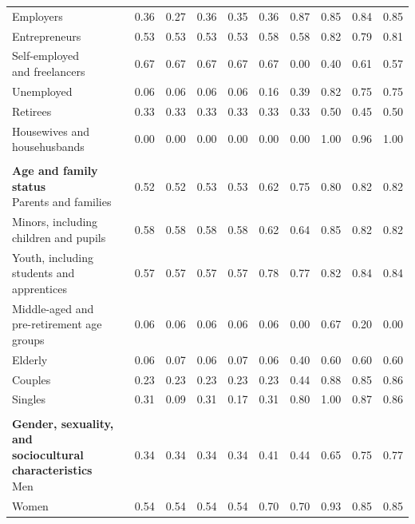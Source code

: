 \begin{table}[htb]
\begin{threeparttable}
\begin{tabular}{l c c c c c c c c c}
Employers & 0.36 & 0.27 & 0.36 & 0.35 & 0.36 & 0.87 & 0.85 & 0.84 & 0.85 \\
Entrepreneurs & 0.53 & 0.53 & 0.53 & 0.53 & 0.58 & 0.58 & 0.82 & 0.79 & 0.81 \\
\shortstack[l]{Self-employed\\[-3pt]and freelancers} & 0.67 & 0.67 & 0.67 & 0.67 & 0.67 & 0.00 & 0.40 & 0.61 & 0.57 \\
Unemployed & 0.06 & 0.06 & 0.06 & 0.06 & 0.16 & 0.39 & 0.82 & 0.75 & 0.75 \\
Retirees & 0.33 & 0.33 & 0.33 & 0.33 & 0.33 & 0.33 & 0.50 & 0.45 & 0.50 \\
\shortstack[l]{Housewives and\\[-3pt]househusbands} & 0.00 & 0.00 & 0.00 & 0.00 & 0.00 & 0.00 & 1.00 & 0.96 & 1.00 \\
\rule{0pt}{5pt} &  &  &  &  &  &  &  &  &  \\
\shortstack[l]{\textbf{Age and family status}\\[3pt]Parents and families} & 0.52 & 0.52 & 0.53 & 0.53 & 0.62 & 0.75 & 0.80 & 0.82 & 0.82 \\
\shortstack[l]{Minors, including\\[-3pt]children and pupils} & 0.58 & 0.58 & 0.58 & 0.58 & 0.62 & 0.64 & 0.85 & 0.82 & 0.82 \\
\shortstack[l]{Youth, including\\[-3pt]students and apprentices} & 0.57 & 0.57 & 0.57 & 0.57 & 0.78 & 0.77 & 0.82 & 0.84 & 0.84 \\
\shortstack[l]{Middle-aged and\\[-3pt]pre-retirement age groups} & 0.06 & 0.06 & 0.06 & 0.06 & 0.06 & 0.00 & 0.67 & 0.20 & 0.00 \\
Elderly & 0.06 & 0.07 & 0.06 & 0.07 & 0.06 & 0.40 & 0.60 & 0.60 & 0.60 \\
Couples & 0.23 & 0.23 & 0.23 & 0.23 & 0.23 & 0.44 & 0.88 & 0.85 & 0.86 \\
Singles & 0.31 & 0.09 & 0.31 & 0.17 & 0.31 & 0.80 & 1.00 & 0.87 & 0.86 \\
\rule{0pt}{5pt} &  &  &  &  &  &  &  &  &  \\
\shortstack[l]{\textbf{Gender, sexuality, and}\\[-3pt]\textbf{sociocultural characteristics}\\[3pt]Men} & 0.34 & 0.34 & 0.34 & 0.34 & 0.41 & 0.44 & 0.65 & 0.75 & 0.77 \\
Women & 0.54 & 0.54 & 0.54 & 0.54 & 0.70 & 0.70 & 0.93 & 0.85 & 0.85 \\

\end{tabular}
\end{threeparttable}
\end{table}
